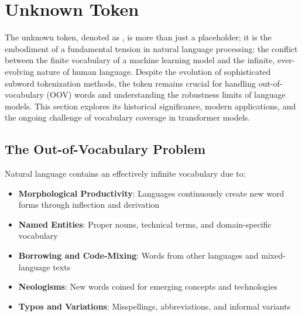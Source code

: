 \section{Unknown Token \unk{}}

The unknown token, denoted as \unk{}, is more than just a placeholder; it is the embodiment of a fundamental tension in natural language processing: the conflict between the finite vocabulary of a machine learning model and the infinite, ever-evolving nature of human language. Despite the evolution of sophisticated subword tokenization methods, the \unk{} token remains crucial for handling out-of-vocabulary (OOV) words and understanding the robustness limits of language models. This section explores its historical significance, modern applications, and the ongoing challenge of vocabulary coverage in transformer models.

\subsection{The Out-of-Vocabulary Problem}

Natural language contains an effectively infinite vocabulary due to:

\begin{itemize}
\item \textbf{Morphological Productivity}: Languages continuously create new word forms through inflection and derivation
\item \textbf{Named Entities}: Proper nouns, technical terms, and domain-specific vocabulary
\item \textbf{Borrowing and Code-Mixing}: Words from other languages and mixed-language texts
\item \textbf{Neologisms}: New words coined for emerging concepts and technologies
\item \textbf{Typos and Variations}: Misspellings, abbreviations, and informal variants
\end{itemize}

